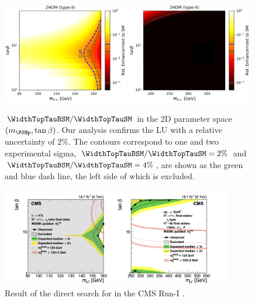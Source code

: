 \begin{figure}[ht]
    \centering
    \includegraphics[width=0.49\textwidth]{chapters/Physics/sectionBSM/figures/RelEnhance2.png}
    \includegraphics[width=0.49\textwidth]{chapters/Physics/sectionBSM/figures/RelEnhance2_heavy.png}
    \caption{$\WidthTopTauBSM/\WidthTopTauSM$  in the 2D parameter space $(m_{\PSHp}, \tan\beta)$. Our analysis confirms the LU with a relative uncertainty of $2\%$. The contours correspond to one and two experimental sigma, $\WidthTopTauBSM/\WidthTopTauSM = 2\%$ and $\WidthTopTauBSM/\WidthTopTauSM = 4\%$, are shown as the green and blue dash line, the left side of which is excluded.  }
    \label{fig:physics:bsm:chargedHiggs:relEnahnce2d}
\end{figure}

\begin{figure}[ht]
    \centering
    \includegraphics[width=0.9\textwidth]{chapters/Physics/sectionBSM/figures/2HDM_search.png}
    \caption{Result of the direct search for \PSHp in the CMS Run-I \cite{Khachatryan:2015qxa}. }
    \label{fig:physics:bsm:chargedHiggs:directsearch}
\end{figure}


